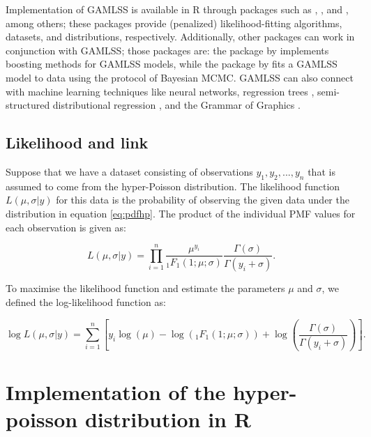 Implementation of GAMLSS is available in R through packages such as , , and , among others; these packages provide (penalized) likelihood-fitting algorithms, datasets, and distributions, respectively. Additionally, other packages can work in conjunction with GAMLSS; those packages are: the  package by \citet{gamboostLSS_pack} implements boosting methods for GAMLSS models, while the  package by \citet{bamlss_pack} fits a GAMLSS model to data using the protocol of Bayesian MCMC. GAMLSS can also connect with machine learning techniques like neural networks, regression trees , semi-structured distributional regression \citep{SSDR.2024}, and the Grammar of Graphics .

\subsection{Likelihood and link}\label{likelihood-and-link}

Suppose that we have a dataset consisting of observations \(y_{1}, y_{2}, ..., y_{n}\) that is assumed to come from the hyper-Poisson distribution. The likelihood function \(L(\mu, \sigma | y)\) for this data is the probability of observing the given data under the distribution in equation \eqref{eq:pdfhp}. The product of the individual PMF values for each observation is given as:

\begin{equation}    
L(\mu, \sigma | y) = \prod_{i=1}^{n} \frac{\mu ^{y_{i}}}{_1F_1(1;\mu;\sigma)}\frac{\Gamma(\sigma)}{\Gamma(y_{i}+ \sigma)}.
\label{eq:lik}
\end{equation}

To maximise the likelihood function and estimate the parameters \(\mu\) and \(\sigma\), we defined the log-likelihood function as:

\begin{equation}
\log L(\mu,\sigma | y) = \sum_{i=1}^{n} \left[ y_i \log(\mu) - \log\left({_1F_1(1;\mu;\sigma)}\right) + \log\left(\frac{\Gamma(\sigma)}{\Gamma(y_i+ \sigma)}\right) \right].
\label{eq:logli}
\end{equation}

\section{Implementation of the hyper-poisson distribution in R}\label{implementation-of-the-hyper-poisson-distribution-in-r}

